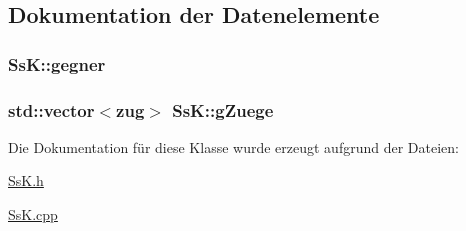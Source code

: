 \subsection{Dokumentation der Datenelemente}
\hypertarget{class_ss_k_a4c117e68ae76434738995801a4a1fbcc}{}
\subsubsection[{gegner}]{ Ss\+K\+::gegner\hspace{0.3cm}{\ttfamily [private]}}\label{class_ss_k_a4c117e68ae76434738995801a4a1fbcc}
\hypertarget{class_ss_k_af5cfdbc60256434dbb73e61e737e056a}{}
\subsubsection[{g\+Zuege}]{\setlength{\rightskip}{0pt plus 5cm}std\+::vector$<${\bf zug}$>$ Ss\+K\+::g\+Zuege\hspace{0.3cm}{\ttfamily [private]}}\label{class_ss_k_af5cfdbc60256434dbb73e61e737e056a}


Die Dokumentation für diese Klasse wurde erzeugt aufgrund der Dateien\+:\begin{DoxyCompactItemize}
\item 
\hyperlink{_ss_k_8h}{Ss\+K.\+h}\item 
\hyperlink{_ss_k_8cpp}{Ss\+K.\+cpp}\end{DoxyCompactItemize}
